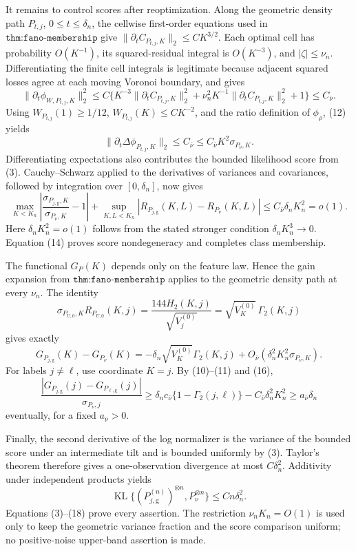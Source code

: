 It remains to control scores after reoptimization.  Along the geometric density path \(P_{t,j}\), \(0\leq t\leq\delta_n\), the cellwise first-order equations used in \(\texttt{thm:fano-membership}\) give \(\|\partial_tC_{P_{t,j},K}\|_2\leq CK^{3/2}\).  Each optimal cell has probability \(O(K^{-1})\), its squared-residual integral is \(O(K^{-3})\), and \(|\zeta|\leq\nu_n\).  Differentiating the finite cell integrals is legitimate because adjacent squared losses agree at each moving Voronoi boundary, and gives
\[
 \|\partial_t\phi_{W,P_{t,j},K}\|_2^2
 \leq C\{K^{-3}\|\partial_tC_{P_{t,j},K}\|_2^2
 +\nu_n^2K^{-1}\|\partial_tC_{P_{t,j},K}\|_2^2+1\}
 \leq C_{\bar\nu}.                                                       \tag{12}
\]
Using \(W_{P_{t,j}}(1)\geq1/12\), \(W_{P_{t,j}}(K)\leq CK^{-2}\), and the ratio definition of \(\phi_\rho\), (12) yields
\[
 \|\partial_t\Delta\phi_{P_{t,j},K}\|_2
 \leq C_{\bar\nu}\leq C_{\bar\nu}K^2\sigma_{P_\nu,K}.                \tag{13}
\]
Differentiating expectations also contributes the bounded likelihood score from (3).  Cauchy--Schwarz applied to the derivatives of variances and covariances, followed by integration over \([0,\delta_n]\), now gives
\[
 \max_{K<K_n}\left|\frac{\sigma_{P_{j,\mathrm g},K}}{\sigma_{P_\nu,K}}-1\right|
 +\sup_{K,L<K_n}|R_{P_{j,\mathrm g}}(K,L)-R_{P_\nu}(K,L)|
 \leq C_{\bar\nu}\delta_nK_n^2=o(1).                                  \tag{14}
\]
Here \(\delta_nK_n^2=o(1)\) follows from the stated stronger condition \(\delta_nK_n^3\to0\).  Equation (14) proves score nondegeneracy and completes class membership.

The functional \(G_P(K)\) depends only on the feature law.  Hence the gain expansion from \(\texttt{thm:fano-membership}\) applies to the geometric density path at every \(\nu_n\).  The identity
\[
 \sigma_{P_{U,0},K}R_{P_{U,0}}(K,j)
 =\frac{144H_2(K,j)}{\sqrt{V_j^{(0)}}}
 =\sqrt{V_K^{(0)}}\,\Gamma_2(K,j)                                      \tag{15}
\]
gives exactly
\[
 G_{P_{j,\mathrm g}}(K)-G_{P_\nu}(K)
 =-\delta_n\sqrt{V_K^{(0)}}\Gamma_2(K,j)
 +O_{\bar\nu}(\delta_n^2K_n^2\sigma_{P_\nu,K}).                       \tag{16}
\]
For labels \(j\ne\ell\), use coordinate \(K=j\).  By (10)--(11) and (16),
\[
 \frac{|G_{P_{j,\mathrm g}}(j)-G_{P_{\ell,\mathrm g}}(j)|}{\sigma_{P_\nu,j}}
 \geq \delta_nc_{\bar\nu}\{1-\Gamma_2(j,\ell)\}
 -C_{\bar\nu}\delta_n^2K_n^2
 \geq a_{\bar\nu}\delta_n                                             \tag{17}
\]
eventually, for a fixed \(a_{\bar\nu}>0\).

Finally, the second derivative of the log normalizer is the variance of the bounded score under an intermediate tilt and is bounded uniformly by (3).  Taylor's theorem therefore gives a one-observation divergence at most \(C\delta_n^2\).  Additivity under independent products yields
\[
 \operatorname{KL}\{(P_{j,\mathrm g}^{(n)})^{\otimes n},P_\nu^{\otimes n}\}
 \leq Cn\delta_n^2.                                                       \tag{18}
\]
Equations (3)--(18) prove every assertion.  The restriction \(\nu_nK_n=O(1)\) is used only to keep the geometric variance fraction and the score comparison uniform; no positive-noise upper-band assertion is made.